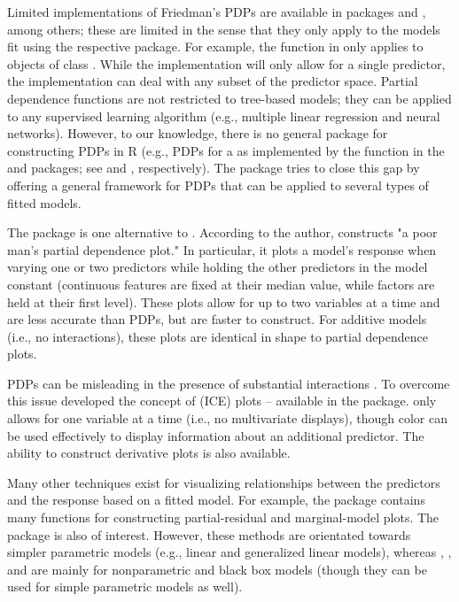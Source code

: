 Limited implementations of Friedman's PDPs are available in packages  \citep{randomForest-pkg} and , among others; these are limited in the sense that they only apply to the models fit using the respective package. For example, the  function in  only applies to objects of class . While the  implementation will only allow for a single predictor, the  implementation can deal with any subset of the predictor space. Partial dependence functions are not restricted to tree-based models; they can be applied to any supervised learning algorithm (e.g., multiple linear regression and neural networks). However, to our knowledge, there is no general package for constructing PDPs  in R (e.g., PDPs for a  as implemented by the  function in the  and  packages; see \citet{party-pkg} and \citet{partykit-pkg}, respectively). The  \citep{partial-pkg} package tries to close this gap by offering a general framework for PDPs that can be applied to several types of fitted models.

The  package \citep{plotmo-pkg} is one alternative to . According to the author,  constructs "a poor man's partial dependence plot." In particular, it plots a model's response when varying one or two predictors while holding the other predictors in the model constant (continuous features are fixed at their median value, while factors are held at their first level). These plots allow for up to two variables at a time and are less accurate than PDPs, but are faster to construct. For additive models (i.e., no interactions), these plots are identical in shape to partial dependence plots.

PDPs can be misleading in the presence of substantial interactions \citep{goldstein-peeking-2015}. To overcome this issue \citeauthor*{goldstein-peeking-2015} developed the concept of  (ICE) plots -- available in the  package.  only allows for one variable at a time (i.e., no multivariate displays), though color can be used effectively to display information about an additional predictor. The ability to construct derivative plots is also available.

Many other techniques exist for visualizing relationships between the predictors and the response based on a fitted model. For example, the  package \citep{fox-car-2011} contains many functions for constructing partial-residual and marginal-model plots. The  package \citep{fox-effects-2003} is also of interest. However, these methods are orientated towards simpler parametric models (e.g., linear and generalized linear models), whereas , , and  are mainly for nonparametric and black box models (though they can be used for simple parametric models as well).


